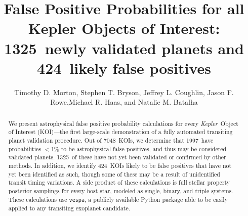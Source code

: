 \documentclass{emulateapj}
\newcommand{\ncalc}{7048}
\newcommand{\nval}{1997} %
\newcommand{\nvalnew}{1325} %
\newcommand{\nfpnew}{424}  %
\newcommand{\kepler}{\textit{Kepler}}
\newcommand{\vespa}{\texttt{vespa}}
\begin{document}

\title{False Positive Probabilities for all Kepler Objects of Interest: \\
        \nvalnew\ newly validated planets and \nfpnew\ likely false positives}


\author{Timothy D. Morton, Stephen T. Bryson, Jeffrey L. Coughlin, Jason F. Rowe,Michael R. Haas, and Natalie M. Batalha}






\begin{abstract}
We present astrophysical false positive probability calculations for
every \kepler\ Object of Interest (KOI)---the first large-scale
demonstration of a fully automated transiting planet validation
procedure.  Out of \ncalc\ KOIs, we determine that \nval\ have
probabilities $<$1\% to be astrophysical false positives, and thus may
be considered validated planets.  \nvalnew\ of these have not yet been
validated or confirmed by other methods.  In addition, we identify
\nfpnew\ KOIs likely to be false positives that have not yet been
identified as such, though some of these may be a result of
unidentified transit timing variations. A side product of these
calculations is full stellar property posterior samplings for every
host star, modeled as single, binary, and triple systems.  These
calculations use \vespa, a publicly available Python package able to
be easily applied to any transiting exoplanet candidate.
\end{abstract}
\end{document}
